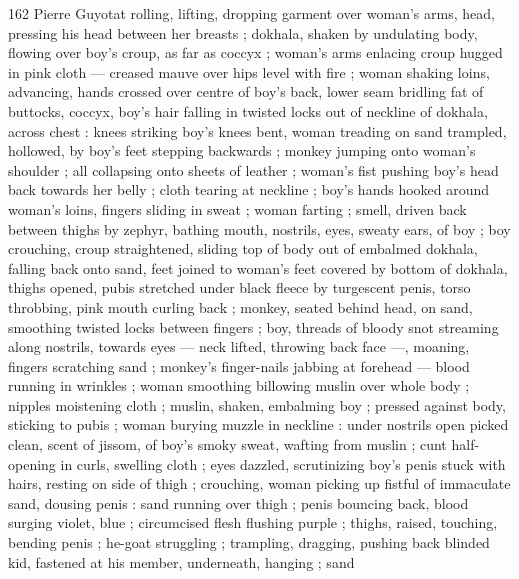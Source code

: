 162 Pierre Guyotat
rolling, lifting, dropping garment over woman's arms, head, pressing
his head between her breasts ; dokhala, shaken by undulating body,
flowing over boy's croup, as far as coccyx ; woman's arms enlacing
croup hugged in pink cloth — creased mauve over hips level with fire
; woman shaking loins, advancing, hands crossed over centre of
boy's back, lower seam bridling fat of buttocks, coccyx, boy's hair
falling in twisted locks out of neckline of dokhala, across chest :
knees striking boy's knees bent, woman treading on sand trampled,
hollowed, by boy's feet stepping backwards ; monkey jumping onto
woman's shoulder ; all collapsing onto sheets of leather ; woman's
fist pushing boy's head back towards her belly ; cloth tearing at
neckline ; boy's hands hooked around woman's loins, fingers sliding
in sweat ; woman farting ; smell, driven back between thighs by
zephyr, bathing mouth, nostrils, eyes, sweaty ears, of boy ; boy
crouching, croup straightened, sliding top of body out of embalmed
dokhala, falling back onto sand, feet joined to woman's feet covered
by bottom of dokhala, thighs opened, pubis stretched under black
fleece by turgescent penis, torso throbbing, pink mouth curling back
; monkey, seated behind head, on sand, smoothing twisted locks
between fingers ; boy, threads of bloody snot streaming along
nostrils, towards eyes — neck lifted, throwing back face —,
moaning, fingers scratching sand ; monkey's finger-nails jabbing at
forehead — blood running in wrinkles ; woman smoothing billowing
muslin over whole body ; nipples moistening cloth ; muslin, shaken,
embalming boy ; pressed against body, sticking to pubis ; woman
burying muzzle in neckline : under nostrils open picked clean, scent
of jissom, of boy's smoky sweat, wafting from muslin ; cunt half-
opening in curls, swelling cloth ; eyes dazzled, scrutinizing boy's
penis stuck with hairs, resting on side of thigh ; crouching, woman
picking up fistful of immaculate sand, dousing penis : sand running
over thigh ; penis bouncing back, blood surging violet, blue ;
circumcised flesh flushing purple ; thighs, raised, touching, bending
penis ; he-goat struggling ; trampling, dragging, pushing back
blinded kid, fastened at his member, underneath, hanging ; sand

